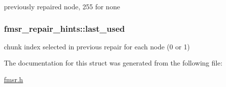 previously repaired node, 255 for none 

\hypertarget{structfmsr__repair__hints_a17f34e84f1c239e4e61fe42ff339fb5e}{
\subsubsection[{last\-\_\-used}]{ {\bf fmsr\-\_\-repair\-\_\-hints\-::last\-\_\-used}}}\label{structfmsr__repair__hints_a17f34e84f1c239e4e61fe42ff339fb5e}


chunk index selected in previous repair for each node (0 or 1) 



\-The documentation for this struct was generated from the following file\-:\begin{DoxyCompactItemize}
\item 
\hyperlink{fmsr_8h}{fmsr.\-h}\end{DoxyCompactItemize}
